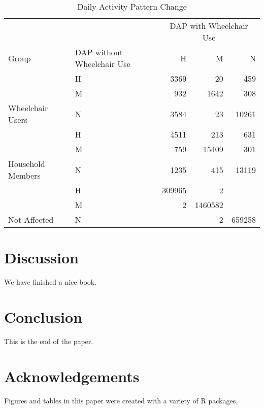 \documentclass[3p, authoryear, review]{elsarticle} %
\begin{document}
\begin{table}

\caption{\label{tab:dap-summary}Daily Activity Pattern Change}
\centering
\begin{tabular}[t]{llrrr}
\toprule
\multicolumn{1}{c}{} & \multicolumn{1}{c}{} & \multicolumn{3}{c}{DAP with Wheelchair Use} \\
\cmidrule(l{3pt}r{3pt}){3-5}
Group & DAP without Wheelchair Use & H & M & N\\
\midrule
 & H & 3369 & 20 & 459\\

 & M & 932 & 1642 & 308\\

\multirow{-3}{*}{\raggedright\arraybackslash Wheelchair Users} & N & 3584 & 23 & 10261\\
\cmidrule{1-5}
 & H & 4511 & 213 & 631\\

 & M & 759 & 15409 & 301\\

\multirow{-3}{*}{\raggedright\arraybackslash Household Members} & N & 1235 & 415 & 13119\\
\cmidrule{1-5}
 & H & 309965 & 2 & \\

 & M & 2 & 1460582 & \\

\multirow{-3}{*}{\raggedright\arraybackslash Not Affected} & N &  & 2 & 659258\\
\bottomrule
\end{tabular}
\end{table}

\hypertarget{discussion}{%
\section{Discussion}\label{discussion}}

We have finished a nice book.

\hypertarget{conclusion}{%
\section{Conclusion}\label{conclusion}}

This is the end of the paper.

\hypertarget{acks}{%
\section*{Acknowledgements}\label{acks}}

Figures and tables in this paper were created with a variety of R
packages.


\end{document}
